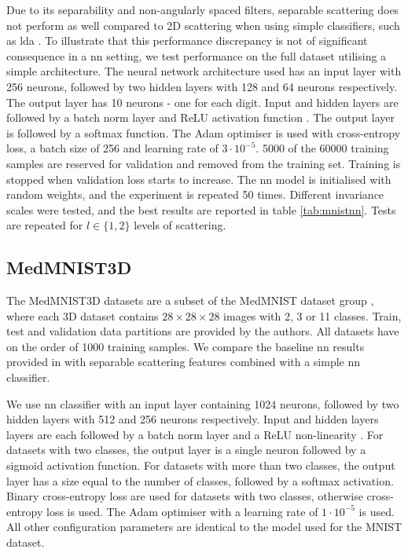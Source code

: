 \documentclass[journal]{IEEEtran}
\begin{document}
Due to its separability and non-angularly spaced filters, separable scattering does not perform as well compared to 2D scattering when using simple classifiers, such as \ac{lda} \cite{lda}. To illustrate that this performance discrepancy is not of significant consequence in a \ac{nn} setting, we test performance on the full dataset utilising a simple architecture. The neural network architecture used has an input layer with 256 neurons, followed by two hidden layers with 128 and 64 neurons respectively. The output layer has 10 neurons - one for each digit. Input and hidden layers are followed by a batch norm layer \cite{batchnorm} and ReLU activation function \cite{relu}. The output layer is followed by a softmax function. The Adam optimiser \cite{adam} is used with cross-entropy loss, a batch size of 256 and learning rate of $3 \cdot 10^{-5}$. 5000 of the 60000 training samples are reserved for validation and removed from the training set. Training is stopped when validation loss starts to increase. The \ac{nn} model is initialised with random weights, and the experiment is repeated 50 times. Different invariance scales were tested, and the best results are reported in table \ref{tab:mnistnn}. Tests are repeated for $l \in \{1, 2\}$ levels of scattering.





\subsection{MedMNIST3D}






The MedMNIST3D datasets are a subset of the MedMNIST dataset group \cite{medmnist}, where each 3D dataset contains $28\times 28 \times 28$ images with 2, 3 or 11 classes. Train, test and validation data partitions are provided by the authors. All datasets have on the order of 1000 training samples. We compare the baseline \ac{nn} results provided in \cite{medmnist} with separable scattering features combined with a simple \ac{nn} classifier.

We use \ac{nn} classifier with an input layer containing 1024 neurons, followed by two hidden layers with 512 and 256 neurons respectively. Input and hidden layers layers are each followed by a batch norm layer \cite{batchnorm} and a ReLU non-linearity \cite{relu}. For datasets with two classes, the output layer is a single neuron followed by a sigmoid activation function. For datasets with more than two classes, the output layer has a size equal to the number of classes, followed by a softmax activation. Binary cross-entropy loss are used for datasets with two classes, otherwise cross-entropy loss is used. The Adam optimiser \cite{adam} with a learning rate of $1 \cdot 10^{-5}$ is used. All other configuration parameters are identical to the model used for the MNIST dataset.
\end{document}
